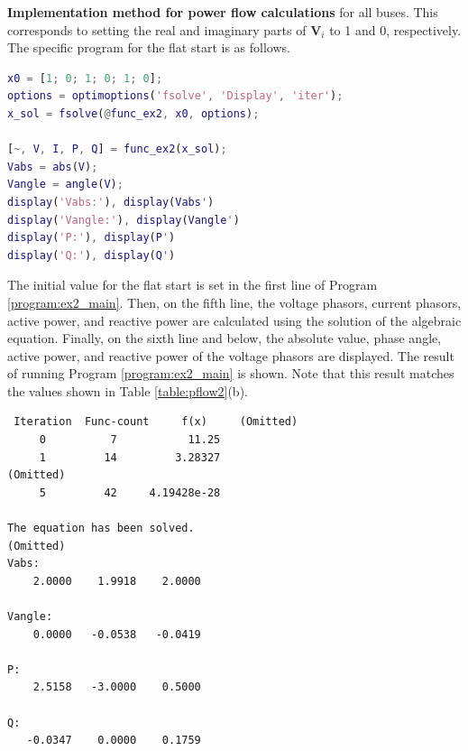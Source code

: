\documentclass[graybox, envcountchap]{svmult}
\begin{document}
\begin{example}{\textbf{Implementation method for power flow
calculations}}
for all buses. This corresponds to setting the real and imaginary parts of $\bm
V_i$ to 1 and 0, respectively. The specific program for the flat start is as
follows.

\begin{lstlisting}[language=Matlab, caption=main\_ex2.m, label={program:ex2_main}]
x0 = [1; 0; 1; 0; 1; 0];
options = optimoptions('fsolve', 'Display', 'iter');
x_sol = fsolve(@func_ex2, x0, options);

[~, V, I, P, Q] = func_ex2(x_sol);
Vabs = abs(V);
Vangle = angle(V);
display('Vabs:'), display(Vabs')
display('Vangle:'), display(Vangle')
display('P:'), display(P')
display('Q:'), display(Q')
\end{lstlisting}

The initial value for the flat start is set in the first line of Program
\ref{program:ex2_main}. Then, on the fifth line, the voltage phasors, current
phasors, active power, and reactive power are calculated using the solution of
the algebraic equation. Finally, on the sixth line and below, the absolute
value, phase angle, active power, and reactive power of the voltage phasors are
displayed. The result of running Program \ref{program:ex2_main} is shown. Note
that this result matches the values shown in Table \ref{table:pflow2}(b).

\smallskip
\begin{execution}
\begin{verbatim}
 Iteration  Func-count     f(x)     (Omitted)
     0          7           11.25 
     1         14         3.28327 
(Omitted)
     5         42     4.19428e-28

The equation has been solved.
(Omitted)
Vabs:
    2.0000    1.9918    2.0000

Vangle:
    0.0000   -0.0538   -0.0419

P:
    2.5158   -3.0000    0.5000

Q:
   -0.0347    0.0000    0.1759
\end{verbatim}
\end{execution}

\end{example}

\end{document}
